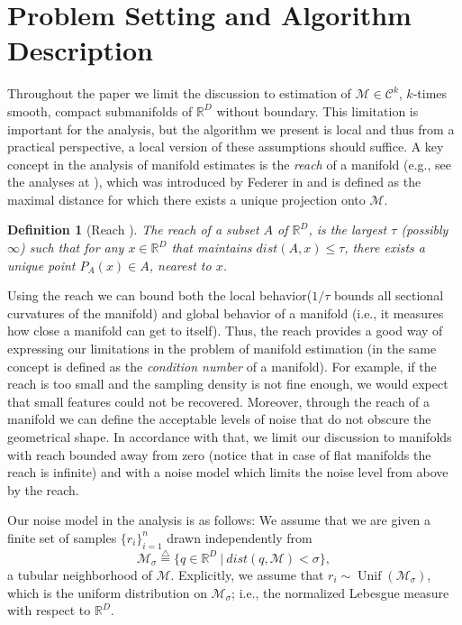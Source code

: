 \documentclass[12pt]{article}
\newtheorem{definition}{Definition}
\theoremstyle{remark}
\newcommand{\RR}{\mathbb{R}}
\newcommand{\MM}{\mathcal{M}}
\newcommand{\C}{\mathcal{C}}
\newcommand{\defeq}{\stackrel{\bigtriangleup}{=}}
\begin{document}
\section{Problem Setting and Algorithm Description}
\label{sec:Problem_Setting}
Throughout the paper we limit the discussion to estimation of $\MM\in\C^k$, $k$-times smooth, compact submanifolds of $\RR^D$ without boundary.
This limitation is important for the analysis, but the algorithm we present is local and thus from a practical perspective, a local version of these assumptions should suffice.
A key concept in the analysis of manifold estimates is the \textit{reach} of a manifold (e.g., see the analyses at \cite{aamari2018stability,aamari2019nonasymptotic,fefferman2018fitting,niyogi2008finding}), which was introduced by Federer in \cite{federer1959curvature} and is defined as the maximal distance for which there exists a unique projection onto $\MM$.
\begin{definition}[Reach \cite{federer1959curvature}]\label{def:reach}
The reach of a subset $A$ of $\RR^D$, is the largest $\tau$ \emph{(}possibly $\infty$\emph{)} such that for any $x\in\RR^D$ that maintains $dist(A,x)\leq \tau$, there exists a unique point $P_A(x)\in A$, nearest to $x$. 
\end{definition}
Using the reach we can bound both the local behavior($1/\tau$ bounds all sectional curvatures of the manifold) and global behavior  of a manifold (i.e., it measures how close a manifold can get to itself). 
Thus, the reach provides a good way of expressing our limitations in the problem of manifold estimation (in \cite{niyogi2008finding} the same concept is defined as the \textit{condition number} of a manifold).
For example, if the reach is too small and the sampling density is not fine enough, we would expect that small features could not be recovered.
Moreover, through the reach of a manifold we can define the acceptable levels of noise that do not obscure the geometrical shape.
In accordance with that, we limit our discussion to manifolds with reach bounded away from zero (notice that in case of flat manifolds the reach is infinite) and with a noise model which limits the noise level from above by the reach.

Our noise model in the analysis is as follows: 
We assume that we are given a finite set of samples $\{r_i\}_{i=1}^n$ drawn independently from 
\begin{equation}\label{eq:Msigma}
    \MM_\sigma \defeq \{q\in \RR^D ~|~ dist(q, \MM) < \sigma \}
,\end{equation}
a tubular neighborhood of $\MM$.
Explicitly, we assume that $r_i \sim \operatorname{Unif}(\MM_\sigma)$, which is the uniform distribution on $\MM_\sigma$; i.e., the normalized Lebesgue measure with respect to $\RR^D$.
\end{document}

